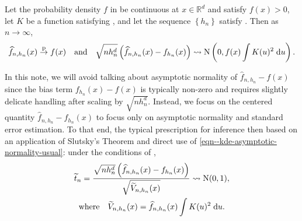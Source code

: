 \begin{theorem}
\label{thm--kde-asymptotic-normality-usual}
Let the probability density \(f\) in  be continuous at \(x
\in \mathbb{R}^{d}\) and satisfy \(f (x) > 0\), let \(K\) be a function
satisfying , and let the sequence \(\left\{ h_{n} \right\}\)
satisfy .
Then as \(n \to \infty\),
\begin{equation}
  \widehat{f}_{n, h_{n}} (x) \overset{\mathrm{p}}{\to} f (x) \quad \text{and}
  \quad
  \sqrt{n h_{n}^{d}} \left( \widehat{f}_{n, h_{n}} (x) - f_{h_{n}} (x) \right)
  \rightsquigarrow \mathrm{N} \left( 0, f (x) \int K (u)^{2} \; \mathrm{d} u \right).
  \label{eqn--kde-asymptotic-normality-usual}
\end{equation}
\end{theorem}

In this note, we will avoid talking about asymptotic normality of
\(\widehat{f}_{n, h_{n}} - f (x)\) since the bias term \(f_{h_{n}} (x) - f (x)\)
is typically non-zero and requires slightly delicate handling after scaling by
\(\sqrt{n h_{n}^{d}}\).
Instead, we focus on the centered quantity \(\widehat{f}_{n, h_{n}} - f_{h_{n}}
(x)\) to focus only on asymptotic normality and standard error estimation.
To that end, the typical prescription for inference then based on an application
of Slutsky's Theorem and direct use of
\eqref{eqn--kde-asymptotic-normality-usual}: under the
conditions of ,
\begin{equation}
  \begin{gathered}
    \widetilde{t}_{n} = \frac{\sqrt{n h_{n}^{d}}\left( \widehat{f}_{n, h_{n}}
    (x) - f_{h_{n}} (x) \right)}{\sqrt{\widetilde{V}_{n, h_{n}} (x)}}
    \rightsquigarrow \mathrm{N} (0, 1), \\
    \text{where} \quad \widetilde{V}_{n, h_{n}} (x) = \widehat{f}_{n, h_{n}} (x)
    \int K (u)^{2} \; \mathrm{d} u.
  \end{gathered}
  \label{eqn--kde-asymptotic-normality-tstat-usual}
\end{equation}

